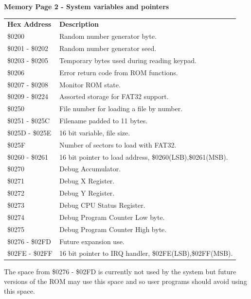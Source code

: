 \documentclass{ol-softwaremanual}
\begin{document}
\begin{table}[H]
\centering
\textbf{Memory Page 2 - System variables and pointers}\\
\begin{tabular}{|l|l|}
\cline{1-2}
\textbf{Hex Address} & \textbf{Description}  \\ \cline{1-2}
\$0200 & Random number generator byte.\\ \cline{1-2}
\$0201 - \$0202 & Random number generator seed.\\ \cline{1-2}
\$0203 - \$0205 & Temporary bytes used during reading keypad.\\ \cline{1-2}
\$0206 & Error return code from ROM functions.\\  \cline{1-2}
\$0207 - \$0208 & Monitor ROM state.\\  \cline{1-2}
\$0209 - \$0224 & Assorted storage for FAT32 support.\\  \cline{1-2}
\$0250 & File number for loading a file by number.\\  \cline{1-2}
\$0251 - \$025C & Filename padded to 11 bytes.\\  \cline{1-2}
\$025D - \$025E & 16 bit variable, file size.\\  \cline{1-2}
\$025F & Number of sectors to load with FAT32.\\  \cline{1-2}
\$0260 - \$0261 & 16 bit pointer to load address, \$0260(LSB),\$0261(MSB).\\  \cline{1-2}
\$0270 & Debug Accumulator.\\  \cline{1-2}
\$0271 & Debug X Register.\\  \cline{1-2}
\$0272 & Debug Y Register.\\  \cline{1-2}
\$0273 & Debug CPU Status Register.\\  \cline{1-2}
\$0274 & Debug Program Counter Low byte.\\  \cline{1-2}
\$0275 & Debug Program Counter High byte.\\  \cline{1-2}
\$0276 - \$02FD & Future expansion use.\\  \cline{1-2}
\$02FE - \$02FF & 16 bit pointer to IRQ handler, \$02FE(LSB),\$02FF(MSB).\\  \cline{1-2}
\end{tabular}
\end{table}
The space from \$0276 - \$02FD is currently not used by the system but future versions of the ROM may use this space and so user programs should avoid using this space.\\
\end{document}
